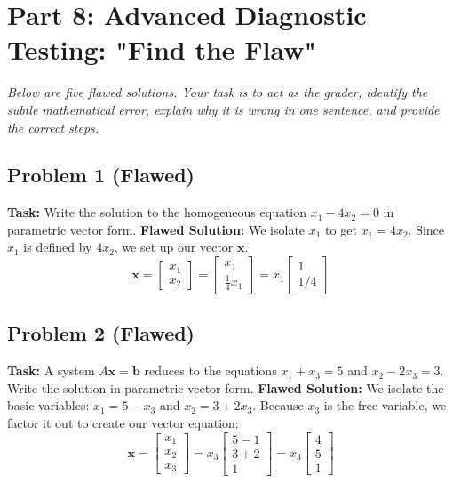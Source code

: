\documentclass[11pt]{article}
\begin{document}
\newpage
\section{Part 8: Advanced Diagnostic Testing: "Find the Flaw"}

\textit{Below are five flawed solutions. Your task is to act as the grader, identify the subtle mathematical error, explain why it is wrong in one sentence, and provide the correct steps.}

\subsection*{Problem 1 (Flawed)}
\textbf{Task:} Write the solution to the homogeneous equation $x_1 - 4x_2 = 0$ in parametric vector form.
\textbf{Flawed Solution:} 
We isolate $x_1$ to get $x_1 = 4x_2$. 
Since $x_1$ is defined by $4x_2$, we set up our vector $\mathbf{x}$. 
\[ \mathbf{x} = \begin{bmatrix} x_1 \\ x_2 \end{bmatrix} = \begin{bmatrix} x_1 \\ \frac{1}{4}x_1 \end{bmatrix} = x_1 \begin{bmatrix} 1 \\ 1/4 \end{bmatrix} \]

\vspace{2cm}

\subsection*{Problem 2 (Flawed)}
\textbf{Task:} A system $A\mathbf{x} = \mathbf{b}$ reduces to the equations $x_1 + x_3 = 5$ and $x_2 - 2x_3 = 3$. Write the solution in parametric vector form.
\textbf{Flawed Solution:}
We isolate the basic variables: $x_1 = 5 - x_3$ and $x_2 = 3 + 2x_3$. 
Because $x_3$ is the free variable, we factor it out to create our vector equation:
\[ \mathbf{x} = \begin{bmatrix} x_1 \\ x_2 \\ x_3 \end{bmatrix} = x_3 \begin{bmatrix} 5 - 1 \\ 3 + 2 \\ 1 \end{bmatrix} = x_3 \begin{bmatrix} 4 \\ 5 \\ 1 \end{bmatrix} \]
\end{document}
